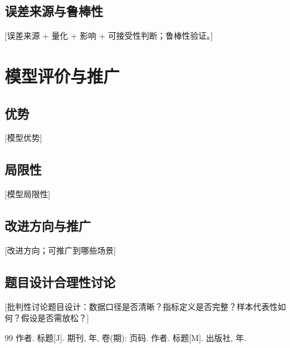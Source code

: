 \documentclass[12pt,a4paper]{ctexart}
\begin{document}
\subsection{误差来源与鲁棒性}

[误差来源 + 量化 + 影响 + 可接受性判断；鲁棒性验证。]

\section{模型评价与推广}

\subsection{优势}

[模型优势]

\subsection{局限性}

[模型局限性]

\subsection{改进方向与推广}

[改进方向；可推广到哪些场景]

\subsection{题目设计合理性讨论}

[批判性讨论题目设计：数据口径是否清晰？指标定义是否完整？样本代表性如何？假设是否需放松？]

\begin{thebibliography}{99}
 作者. 标题[J]. 期刊, 年, 卷(期): 页码.
 作者. 标题[M]. 出版社, 年.
\end{thebibliography}

\appendix
\end{document}
